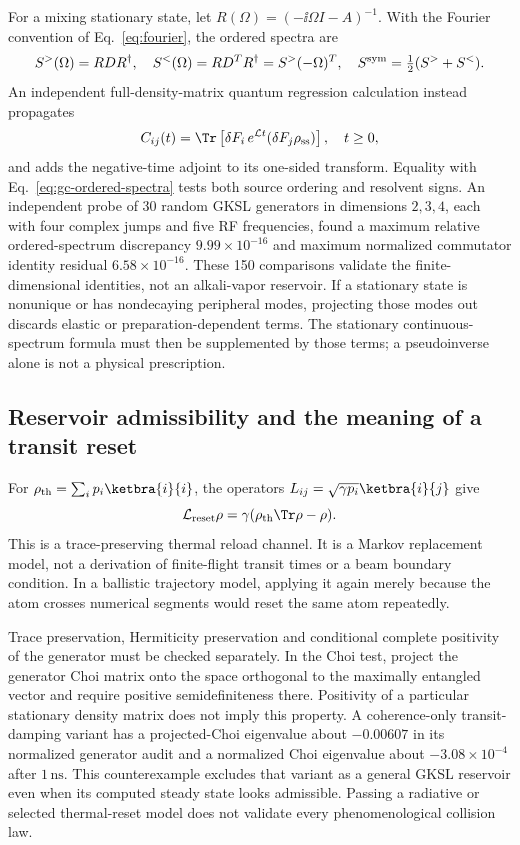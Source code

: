For a mixing stationary state, let
$R(\Omega)=(-\ii\Omega I-A)^{-1}$. With the Fourier convention of
Eq.~\eqref{eq:fourier}, the ordered spectra are
\begin{equation}
 S^>(\Omega)=RDR^\dagger,\quad
 S^<(\Omega)=RD^TR^\dagger=S^>(-\Omega)^T,\quad
 S^{\rm sym}=\tfrac12(S^>+S^<).
 \label{eq:gc-ordered-spectra}
\end{equation}
An independent full-density-matrix quantum regression calculation instead
propagates
\begin{equation}
 C_{ij}(t)=\Tr\left[\delta F_i\,e^{\mathcal L t}
                 (\delta F_j\rho_{\rm ss})\right],\quad t\geq0,
 \label{eq:gc-qrt}
\end{equation}
and adds the negative-time adjoint to its one-sided transform. Equality with
Eq.~\eqref{eq:gc-ordered-spectra} tests both source ordering and resolvent signs.
An independent probe of 30 random GKSL generators in dimensions $2,3,4$, each
with four complex jumps and five RF frequencies, found a maximum relative
ordered-spectrum discrepancy $9.99\times10^{-16}$ and maximum normalized
commutator identity residual $6.58\times10^{-16}$. These 150 comparisons
validate the finite-dimensional identities, not an alkali-vapor reservoir.
If a stationary state is nonunique or has nondecaying peripheral modes,
projecting those modes out discards elastic or preparation-dependent terms.
The stationary continuous-spectrum formula must then be supplemented by those
terms; a pseudoinverse alone is not a physical prescription.

\subsection{Reservoir admissibility and the meaning of a transit reset}
For $\rho_{\rm th}=\sum_i p_i\ketbra{i}{i}$, the operators
$L_{ij}=\sqrt{\gamma p_i}\ketbra{i}{j}$ give
\begin{equation}
 \mathcal L_{\rm reset}\rho
 =\gamma(\rho_{\rm th}\Tr\rho-\rho).
 \label{eq:gc-reset}
\end{equation}
This is a trace-preserving thermal reload channel. It is a Markov replacement
model, not a derivation of finite-flight transit times or a beam boundary
condition. In a ballistic trajectory model, applying it again merely because
the atom crosses numerical segments would reset the same atom repeatedly.

Trace preservation, Hermiticity preservation and conditional complete
positivity of the generator must be checked separately. In the Choi test,
project the generator Choi matrix onto the space orthogonal to the maximally
entangled vector and require positive semidefiniteness there. Positivity of a
particular stationary density matrix does not imply this property. A
coherence-only transit-damping variant has a projected-Choi eigenvalue about
$-0.00607$ in its normalized generator audit and a normalized Choi eigenvalue
about $-3.08\times10^{-4}$ after $1\,\mathrm{ns}$. This counterexample excludes
that variant as a general GKSL reservoir even when its computed steady state
looks admissible. Passing a radiative or selected thermal-reset model does not
validate every phenomenological collision law.


